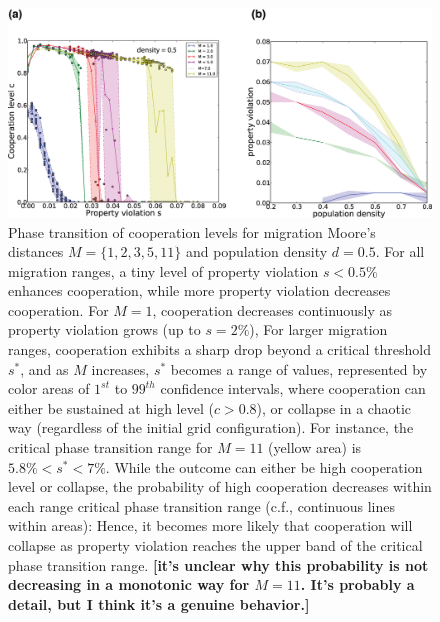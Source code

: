 \begin{figure}[h]
\begin{center}
\centerline{\includegraphics[width=12cm]{../figures2/phase_transition_d05.eps}}
\caption{Phase transition of cooperation levels for migration Moore's distances $M = \{1,2,3,5,11\}$ and population density $d=0.5$. For all migration ranges, a tiny level of property violation $s < 0.5\%$ enhances cooperation, while more property violation decreases cooperation. For $M=1$, cooperation decreases continuously as property violation grows (up to  $s = 2\%$), For larger migration ranges, cooperation exhibits a sharp drop beyond a critical threshold $s^{*}$, and as $M$ increases, $s^{*}$ becomes a range of values, represented by color areas of $1^{st}$ to $99^{th}$ confidence intervals, where cooperation can either be sustained at high level ($c>0.8$), or collapse in a chaotic way (regardless of the initial grid configuration). For instance, the critical phase transition range for $M=11$ (yellow area) is $ 5.8\% < s^{*} < 7\%$. While the outcome can either be high cooperation level or collapse, the probability of high cooperation decreases within each range critical phase transition range (c.f., continuous lines within areas): Hence, it becomes more likely that cooperation will collapse as property violation reaches the upper band of the critical phase transition range. {\bf [it's unclear why this probability is not decreasing in a monotonic way for $M=11$. It's probably a detail, but I think it's a genuine behavior.]}}
\label{fig:phase_transition}
\end{center}
\end{figure}



